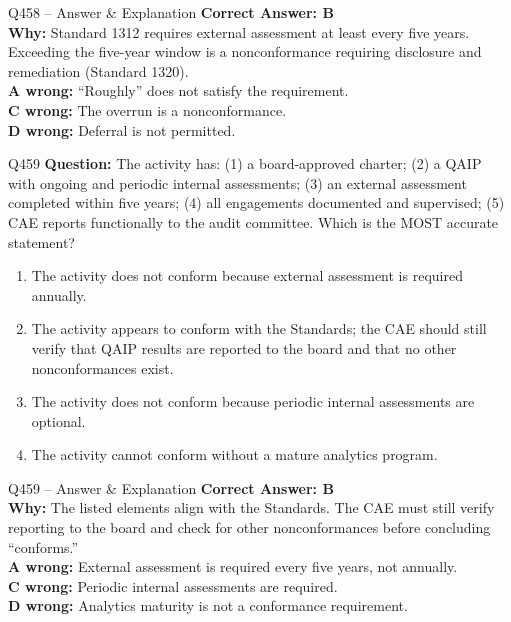 \documentclass[aspectratio=169,10pt]{beamer}
\begin{document}
	\begin{frame}[t]{Q458 -- Answer \& Explanation}
		\small
		\textbf{Correct Answer: B} \\[4pt]
		\textbf{Why:} Standard 1312 requires external assessment at least every five years. Exceeding the five-year window is a nonconformance requiring disclosure and remediation (Standard 1320). \\[4pt]
		\textbf{A wrong:} ``Roughly'' does not satisfy the requirement. \\[2pt]
		\textbf{C wrong:} The overrun is a nonconformance. \\[2pt]
		\textbf{D wrong:} Deferral is not permitted.
	\end{frame}
	
	\begin{frame}[t]{Q459}
		\small
		\textbf{Question:} The activity has: (1) a board-approved charter; (2) a QAIP with ongoing and periodic internal assessments; (3) an external assessment completed within five years; (4) all engagements documented and supervised; (5) CAE reports functionally to the audit committee. Which is the MOST accurate statement?
		\begin{enumerate}[label=\Alph*.,itemsep=1pt,topsep=2pt]
			\item The activity does not conform because external assessment is required annually.
			\item The activity appears to conform with the Standards; the CAE should still verify that QAIP results are reported to the board and that no other nonconformances exist.
			\item The activity does not conform because periodic internal assessments are optional.
			\item The activity cannot conform without a mature analytics program.
		\end{enumerate}
	\end{frame}
	
	\begin{frame}[t]{Q459 -- Answer \& Explanation}
		\small
		\textbf{Correct Answer: B} \\[4pt]
		\textbf{Why:} The listed elements align with the Standards. The CAE must still verify reporting to the board and check for other nonconformances before concluding ``conforms.'' \\[4pt]
		\textbf{A wrong:} External assessment is required every five years, not annually. \\[2pt]
		\textbf{C wrong:} Periodic internal assessments are required. \\[2pt]
		\textbf{D wrong:} Analytics maturity is not a conformance requirement.
	\end{frame}
	
\end{document}
